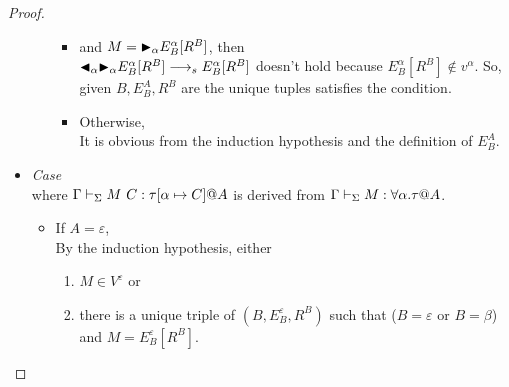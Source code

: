 \begin{proof}
\begin{itemize}
\begin{itemize}
		      	    	\begin{itemize}
		      	    	\item and $ M = {\mathop{\blacktriangleright}}_\alpha E^\alpha_B[R^B] $, then\\
		      	    	    $ {\mathop{\blacktriangleleft}}_\alpha {\mathop{\blacktriangleright}}_\alpha E^\alpha_B[R^B] \longrightarrow_s E^\alpha_B[R^B]$ doesn't hold because $ E^\alpha_B[R^B] \notin v^\alpha$.
		      	    	    So, given $B, E^A_B, R^B$ are the unique tuples satisfies the condition.
		      	    	\item Otherwise,\\
		      	          	It is obvious from the induction hypothesis and the definition of $E^A_B$.
		      	    \end{itemize}
		      \end{itemize}
		      		      	      	      	      	      	      	      	      	      	      	      	      		      	      	      	      
		\item \textit{Case} \TIns\\
			  where \(\Gamma \vdash_\Sigma M\ C :\tau[\alpha \mapsto C] @ A\) is derived from \(\Gamma \vdash_\Sigma M : \forall\alpha.\tau @ A\).
		      		      	      	      	      	      	      	      	      	      	      	      	      		      	      	      	      
		      \begin{itemize}
		      	\item If $ A = \varepsilon$,\\
		      	      By the induction hypothesis, either
		      	      \begin{enumerate}
		      	      	\item $ M \in V^\varepsilon$ or
		      	      	\item there is a unique triple of $(B, E^\varepsilon_B, R^B)$ such that ($B = \varepsilon$ or $B = \beta$) and $M = E^\varepsilon_B[R^B]$.
		      	      \end{enumerate}
		      	      		      	      	      	      	      	      	      	      	      	      	      	      	      	      	      	      	      	      	      	      	      	      	      	      		      	      	      	      	      	      	      	      

\end{itemize}
\end{itemize}
\end{proof}
